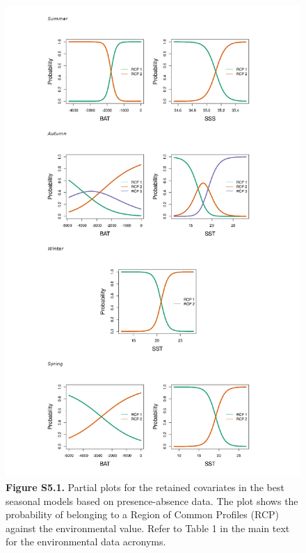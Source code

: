 \documentclass[
]{article}
\begin{document}
\begin{figure}
\centering
\includegraphics{../results/FigS6_1_partial-plots-Bernoulli.png}
\caption{\textbf{Figure S5.1.} Partial plots for the retained covariates
in the best seasonal models based on presence-absence data. The plot
shows the probability of belonging to a Region of Common Profiles (RCP)
against the environmental value. Refer to Table 1 in the main text for
the environmental data acronyms.}
\end{figure}

\newpage
\end{document}
